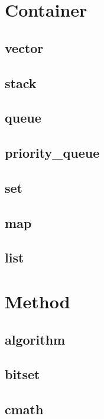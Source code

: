 \documentclass[a4paper, landscape, 8pt]{article}
\begin{document}
\begin{multicols*}{3}
\section{Container}
\subsection{vector}

\subsection{stack}

\subsection{queue}

\subsection{priority\_queue}

\subsection{set}

\subsection{map}

\subsection{list}


\section{Method}
\subsection{algorithm}

\subsection{bitset}

\subsection{cmath}


\end{multicols*}
\end{document}
